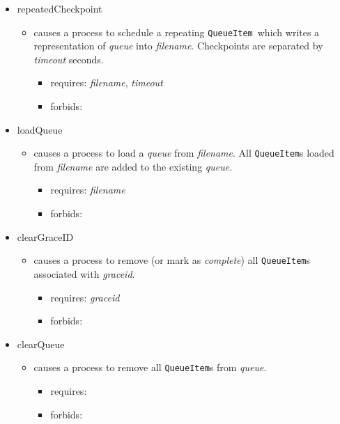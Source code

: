\documentclass{article}
\newcommand{\QueueItem}{\texttt{QueueItem}}
\begin{document}
\begin{itemize}
{         }
    \item{repeatedCheckpoint
        \begin{itemize}
            \item{causes a process to schedule a repeating \QueueItem~which writes a representation of \textit{queue} into \textit{filename}. Checkpoints are separated by \textit{timeout} seconds.
                \begin{itemize}
                    \item{requires: \textit{filename}, \textit{timeout}}
                    \item{forbids: }
                \end{itemize}
                 }
        \end{itemize}
         }
    \item{loadQueue
        \begin{itemize}
            \item{causes a process to load a \textit{queue} from \textit{filename}. All {\QueueItem}s loaded from \textit{filename} are added to the existing \textit{queue}.
                \begin{itemize}
                    \item{requires: \textit{filename}}
                    \item{forbids: }
                \end{itemize}
                 }
        \end{itemize}
         }
    \item{clearGraceID
        \begin{itemize}
            \item{causes a process to remove (or mark as \textit{complete}) all {\QueueItem}s associated with \textit{graceid}.
                \begin{itemize}
                    \item{requires: \textit{graceid}}
                    \item{forbids: }
                \end{itemize}
                 }
        \end{itemize}
         }
    \item{clearQueue
        \begin{itemize}
            \item{causes a process to remove all {\QueueItem}s from \textit{queue}.
                \begin{itemize}
                    \item{requires: }
                    \item{forbids: }
                \end{itemize}
                 }
        \end{itemize}
         }
\end{itemize}
\end{document}
